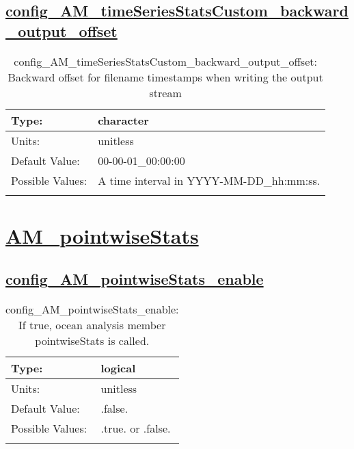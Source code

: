 \subsection[config\_AM\_timeSeriesStatsCustom\_backward\_output\_offset]{\hyperref[sec:nm_tab_AM_timeSeriesStatsCustom]{config\_AM\_timeSeriesStatsCustom\_backward\_output\_offset}}
\label{subsec:nm_sec_config_AM_timeSeriesStatsCustom_backward_output_offset}
\begin{center}
\begin{longtable}{| p{2.0in} || p{4.0in} |}
    \hline
    Type: & character \\
    \hline
    Units: & \si{unitless} \\
    \hline
    Default Value: & 00-00-01\_00:00:00 \\
    \hline
    Possible Values: & A time interval in YYYY-MM-DD\_hh:mm:ss. \\
    \hline
    \caption{config\_AM\_timeSeriesStatsCustom\_backward\_output\_offset: Backward offset for filename timestamps when writing the output stream}
\end{longtable}
\end{center}
\section[AM\_pointwiseStats]{\hyperref[sec:nm_tab_AM_pointwiseStats]{AM\_pointwiseStats}}
\label{sec:nm_sec_AM_pointwiseStats}
\subsection[config\_AM\_pointwiseStats\_enable]{\hyperref[sec:nm_tab_AM_pointwiseStats]{config\_AM\_pointwiseStats\_enable}}
\label{subsec:nm_sec_config_AM_pointwiseStats_enable}
\begin{center}
\begin{longtable}{| p{2.0in} || p{4.0in} |}
    \hline
    Type: & logical \\
    \hline
    Units: & \si{unitless} \\
    \hline
    Default Value: & .false. \\
    \hline
    Possible Values: & .true. or .false. \\
    \hline
    \caption{config\_AM\_pointwiseStats\_enable: If true, ocean analysis member pointwiseStats is called.}
\end{longtable}
\end{center}
